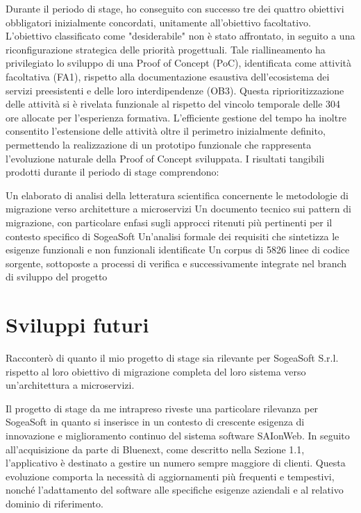         Durante il periodo di stage, ho conseguito con successo tre dei quattro obiettivi obbligatori inizialmente concordati, unitamente all'obiettivo facoltativo. L'obiettivo classificato come "desiderabile" non è stato affrontato, in seguito a una riconfigurazione strategica delle priorità progettuali. Tale riallineamento ha privilegiato lo sviluppo di una Proof of Concept (PoC), identificata come attività facoltativa (FA1), rispetto alla documentazione esaustiva dell'ecosistema dei servizi preesistenti e delle loro interdipendenze (OB3).
Questa riprioritizzazione delle attività si è rivelata funzionale al rispetto del vincolo temporale delle 304 ore allocate per l'esperienza formativa. L'efficiente gestione del tempo ha inoltre consentito l'estensione delle attività oltre il perimetro inizialmente definito, permettendo la realizzazione di un prototipo funzionale che rappresenta l'evoluzione naturale della Proof of Concept sviluppata.
I risultati tangibili prodotti durante il periodo di stage comprendono:

Un elaborato di analisi della letteratura scientifica concernente le metodologie di migrazione verso architetture a microservizi
Un documento tecnico sui pattern di migrazione, con particolare enfasi sugli approcci ritenuti più pertinenti per il contesto specifico di SogeaSoft
Un'analisi formale dei requisiti che sintetizza le esigenze funzionali e non funzionali identificate
Un corpus di 5826 linee di codice sorgente, sottoposte a processi di verifica e successivamente integrate nel branch di sviluppo del progetto



        
    \section{Sviluppi futuri}
    Racconterò di quanto il mio progetto di stage sia rilevante per SogeaSoft S.r.l. rispetto al loro obiettivo di migrazione completa del loro sistema verso un'architettura a microservizi.

    Il progetto di stage da me intrapreso riveste una particolare rilevanza per SogeaSoft in quanto si inserisce in un contesto di crescente esigenza di innovazione e miglioramento continuo del sistema software SAIonWeb. In seguito all’acquisizione da parte di Bluenext, come descritto nella Sezione 1.1, l’applicativo è destinato a gestire un numero sempre maggiore di clienti. Questa evoluzione comporta la necessità di aggiornamenti più frequenti e tempestivi, nonché l’adattamento del software alle specifiche esigenze aziendali e al relativo dominio di riferimento.  

